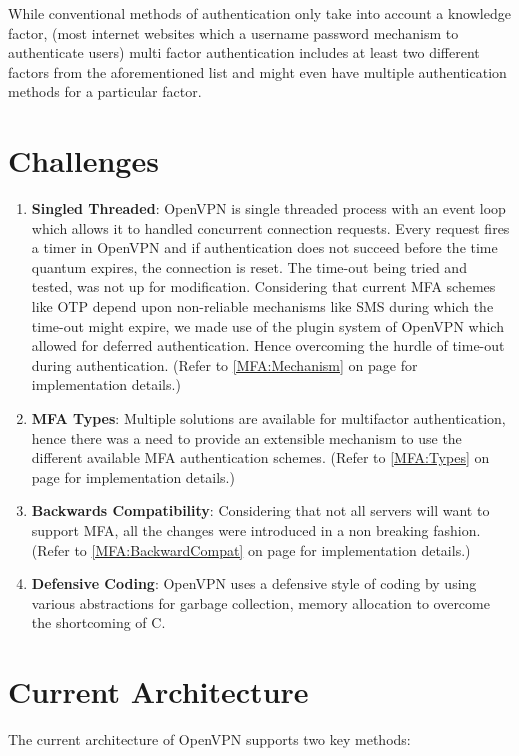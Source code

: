 \documentclass[11pt,oneside]{book}
\begin{document}
While conventional methods of authentication only take into account a knowledge factor,
(most internet websites which a username password mechanism to authenticate users)
multi factor authentication includes at least two different factors from the aforementioned
list and might even have multiple authentication methods for a particular factor.

\section{Challenges}
\begin{enumerate}
    \item \textbf{Singled Threaded}: OpenVPN is single threaded process with an event loop which
        allows it to handled concurrent connection requests. Every request fires a timer in OpenVPN
        and if authentication does not succeed before the time quantum expires, the connection is
        reset. The time-out being tried and tested, was not up for modification.
        Considering that current MFA schemes like OTP depend upon non-reliable mechanisms like
        SMS during which the time-out might expire, we made use of the plugin system of OpenVPN
        which allowed for deferred authentication. Hence overcoming the hurdle of time-out
        during authentication.
        (Refer to \ref{MFA:Mechanism} on page \pageref{MFA:Mechanism} for implementation details.)
    \item \textbf{MFA Types}: Multiple solutions are available for multifactor authentication, hence
        there was a need to provide an extensible mechanism to use the different available MFA
        authentication schemes. (Refer to \ref{MFA:Types} on page \pageref{MFA:Types} for
        implementation details.)
    \item \textbf{Backwards Compatibility}: Considering that not all servers will want to support
        MFA, all the changes were introduced in a non breaking fashion.
        (Refer to \ref{MFA:BackwardCompat} on page \pageref{MFA:BackwardCompat} for implementation details.)
    \item \textbf{Defensive Coding}: OpenVPN uses a defensive style of coding by using various
        abstractions for garbage collection, memory allocation to overcome the shortcoming of C.
\end{enumerate}

\section{Current Architecture}
The current architecture of OpenVPN supports two key methods:
\end{document}
